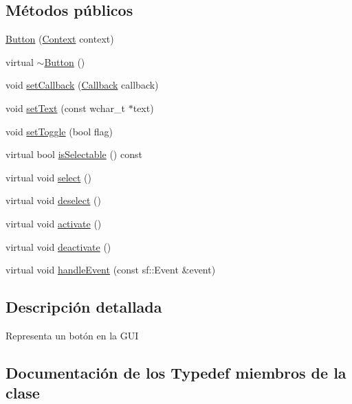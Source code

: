 \subsection*{Métodos públicos}
\begin{DoxyCompactItemize}
\item 
\hyperlink{classGUI_1_1Button_a3e3c8c068b07a9865b516560f93cb253}{Button} (\hyperlink{classContext}{Context} context)
\item 
virtual \hyperlink{classGUI_1_1Button_a98edcfb20ac836db54ecda4260eac1d9}{$\sim$\+Button} ()
\item 
void \hyperlink{classGUI_1_1Button_ae5ac54c7429eaa482eb7069d0efdb79f}{set\+Callback} (\hyperlink{classGUI_1_1Button_ae42ce66ac9fd4834cef81bb6f2fb0dab}{Callback} callback)
\item 
void \hyperlink{classGUI_1_1Button_a26ddad6fdc253dbbc593f0204c15fb24}{set\+Text} (const wchar\+\_\+t $\ast$text)
\item 
void \hyperlink{classGUI_1_1Button_a8198052cf4fe5823c9f5513e778ca94d}{set\+Toggle} (bool flag)
\item 
virtual bool \hyperlink{classGUI_1_1Button_a2fba8dea2886fd3bb33c7e250e695e8a}{is\+Selectable} () const 
\item 
virtual void \hyperlink{classGUI_1_1Button_a8f141129acb9c068ba6b8d19974d8291}{select} ()
\item 
virtual void \hyperlink{classGUI_1_1Button_a6fd040a471dc3ae48ad59cacd93c7292}{deselect} ()
\item 
virtual void \hyperlink{classGUI_1_1Button_ad711a129863e0301c52b896911996123}{activate} ()
\item 
virtual void \hyperlink{classGUI_1_1Button_ab0a1773817447712b17ab1ad6da767da}{deactivate} ()
\item 
virtual void \hyperlink{classGUI_1_1Button_a4d30e4caedd4c4373567ef452acd1fb1}{handle\+Event} (const sf\+::\+Event \&event)
\end{DoxyCompactItemize}


\subsection{Descripción detallada}
Representa un botón en la G\+U\+I 

\subsection{Documentación de los \textquotesingle{}Typedef\textquotesingle{} miembros de la clase}
\hypertarget{classGUI_1_1Button_ae42ce66ac9fd4834cef81bb6f2fb0dab}{}
